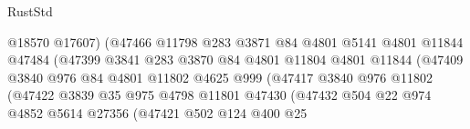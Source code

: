\begin{lexlean}{RustStd}
\begin{coremodule}
                                        @18570
                                        @17607)
                                      (@47466
                                        @11798
                                        @283
                                        @3871
                                        @84
                                        @4801
                                        @5141
                                        @4801
                                        @11844
                                        @47484
                                        (@47399
                                          @3841
                                          @283
                                          @3870
                                          @84
                                          @4801
                                          @11804
                                          @4801
                                          @11844
                                          (@47409
                                            @3840
                                            @976
                                            @84
                                            @4801
                                            @11802
                                            @4625
                                            @999
                                            (@47417
                                              @3840
                                              @976
                                              @11802
                                              (@47422
                                                @3839
                                                @35
                                                @975
                                                @4798
                                                @11801
                                                @47430
                                                (@47432
                                                  @504
                                                  @22
                                                  @974
                                                  @4852
                                                  @5614
                                                  @27356
                                                  (@47421
                                                    @502
                                                    @124
                                                    @400
                                                    @25

\end{coremodule}
\end{lexlean}
